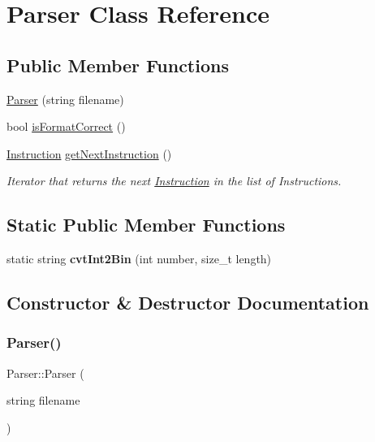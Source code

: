 \hypertarget{class_parser}{}\section{Parser Class Reference}
\label{class_parser}
\subsection*{Public Member Functions}
\begin{DoxyCompactItemize}
\item 
\mbox{\hyperlink{class_parser_acb20af7ff328c6430ff609b424fd7ee0}{Parser}} (string filename)
\item 
bool \mbox{\hyperlink{class_parser_a355fb2bd3a8f68c635f89a1ca8762475}{is\+Format\+Correct}} ()
\item 
\mbox{\label{class_parser_a7b7cb9ad56b48399873675fdcdb28d8f}} 
\mbox{\hyperlink{class_instruction}{Instruction}} \mbox{\hyperlink{class_parser_a7b7cb9ad56b48399873675fdcdb28d8f}{get\+Next\+Instruction}} ()
\begin{DoxyCompactList}\small\item\em Iterator that returns the next \mbox{\hyperlink{class_instruction}{Instruction}} in the list of Instructions. \end{DoxyCompactList}\end{DoxyCompactItemize}
\subsection*{Static Public Member Functions}
\begin{DoxyCompactItemize}
\item 
\mbox{\label{class_parser_aa6e942e5f8ec17806c97bbecef9f6df9}} 
static string {\bfseries cvt\+Int2\+Bin} (int number, size\+\_\+t length)
\end{DoxyCompactItemize}


\subsection{Constructor \& Destructor Documentation}
\mbox{\label{class_parser_acb20af7ff328c6430ff609b424fd7ee0}} 
\subsubsection{\texorpdfstring{Parser()}{Parser()}}
{\footnotesize\ttfamily Parser\+::\+Parser (\begin{DoxyParamCaption}\item[{string}]{filename }\end{DoxyParamCaption})}

